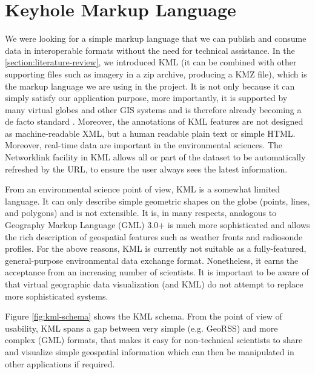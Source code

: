 \section{Keyhole Markup Language}

We were looking for a simple markup language that we can publish and consume data  in interoperable formats without the need for technical assistance. In the \ref{section:literature-review}, we introduced KML (it can be combined with other supporting files such as imagery in a zip archive, producing a KMZ file), which is the markup language we are using in the project. It is not only because it can simply satisfy our application purpose, more importantly, it is supported by many virtual globes and other GIS systems and is therefore already becoming a de facto standard \parencite{blower.sharing-visualizing.2007}. Moreover, the annotations of KML features are not designed as machine-readable XML, but a human readable plain text or simple HTML. Moreover, real-time data are important in the environmental sciences. The Networklink facility in KML allows all or part of the dataset to be automatically refreshed by the URL, to ensure the user always sees the latest information.

From an environmental science point of view, KML is a somewhat limited language. It can only describe simple geometric shapes on the globe (points, lines, and polygons) and is not extensible. It is, in many respects, analogous to Geography Markup Language (GML) 3.0+ is much more sophisticated and allows the rich description of geospatial features such as weather fronts and radiosonde profiles. For the above reasons, KML is currently not suitable as a fully-featured, general-purpose environmental data exchange format. Nonetheless, it earns the acceptance from an increasing number of scientists. It is important to be aware of that virtual geographic data visualization (and KML) do not attempt to replace more sophisticated systems. 

Figure \ref{fig:kml-schema} shows the KML schema. From the point of view of usability, KML spans a gap between very simple (e.g. GeoRSS) and more complex (GML) formats, that makes it easy for non-technical scientists to share and visualize simple geospatial information which can then be manipulated in other applications if required. 

